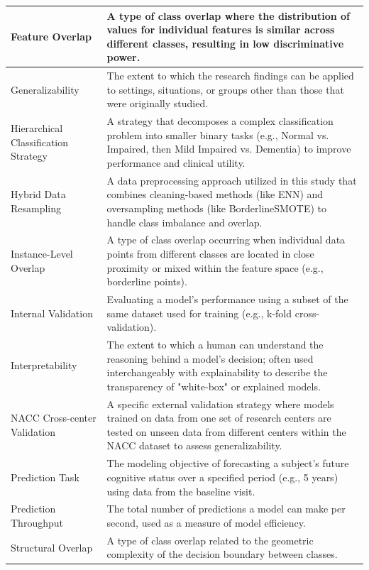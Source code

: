 \begin{longtable}{|M{3cm}|M{9.5cm}|}
        Feature Overlap & A type of class overlap where the distribution of values for individual features is similar across different classes, resulting in low discriminative power. \\ \hline
        Generalizability & The extent to which the research findings can be applied to settings, situations, or groups other than those that were originally studied. \\ \hline
        Hierarchical Classification Strategy & A strategy that decomposes a complex classification problem into smaller binary tasks (e.g., Normal vs. Impaired, then Mild Impaired vs. Dementia) to improve performance and clinical utility. \\ \hline
        Hybrid Data Resampling & A data preprocessing approach utilized in this study that combines cleaning-based methods (like ENN) and oversampling methods (like BorderlineSMOTE) to handle class imbalance and overlap. \\ \hline
        Instance-Level Overlap & A type of class overlap occurring when individual data points from different classes are located in close proximity or mixed within the feature space (e.g., borderline points). \\ \hline
        Internal Validation & Evaluating a model's performance using a subset of the same dataset used for training (e.g., k-fold cross-validation). \\ \hline
        Interpretability & The extent to which a human can understand the reasoning behind a model's decision; often used interchangeably with explainability to describe the transparency of "white-box" or explained models. \\ \hline
        NACC Cross-center Validation & A specific external validation strategy where models trained on data from one set of research centers are tested on unseen data from different centers within the NACC dataset to assess generalizability. \\ \hline
        Prediction Task & The modeling objective of forecasting a subject's future cognitive status over a specified period (e.g., 5 years) using data from the baseline visit. \\ \hline
        Prediction Throughput & The total number of predictions a model can make per second, used as a measure of model efficiency. \\ \hline
        Structural Overlap & A type of class overlap related to the geometric complexity of the decision boundary between classes. \\ \hline

\end{longtable}
